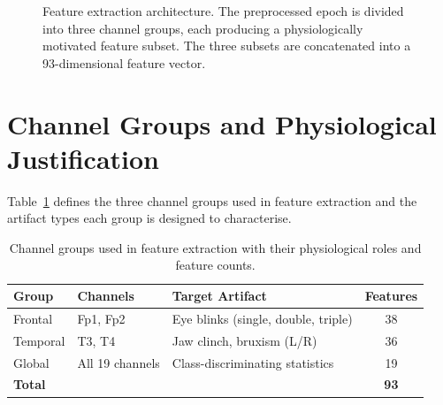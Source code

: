 \begin{figure}[htbp]
\caption{Feature extraction architecture. The preprocessed
epoch is divided into three channel groups, each producing a
physiologically motivated feature subset. The three subsets
are concatenated into a 93-dimensional feature vector.}
\label{fig:feature_overview}
\end{figure}

\section{Channel Groups and Physiological Justification}
\label{sec:fe_groups}

Table~\ref{tab:channel_groups} defines the three channel
groups used in feature extraction and the artifact types
each group is designed to characterise.

\begin{table}[htbp]
\centering
\caption{Channel groups used in feature extraction with their
physiological roles and feature counts.}
\label{tab:channel_groups}
\renewcommand{\arraystretch}{1.3}
\begin{tabular}{p{2.2cm} p{2.5cm} p{3.5cm} c}
\toprule
\textbf{Group} & \textbf{Channels} & \textbf{Target Artifact} &
\textbf{Features} \\
\midrule
Frontal  & Fp1, Fp2            & Eye blinks (single, double, triple) & 38 \\
Temporal & T3, T4              & Jaw clinch, bruxism (L/R) & 36 \\
Global   & All 19 channels     & Class-discriminating statistics & 19 \\
\midrule
\textbf{Total} & & & \textbf{93} \\
\bottomrule
\end{tabular}
\end{table}

